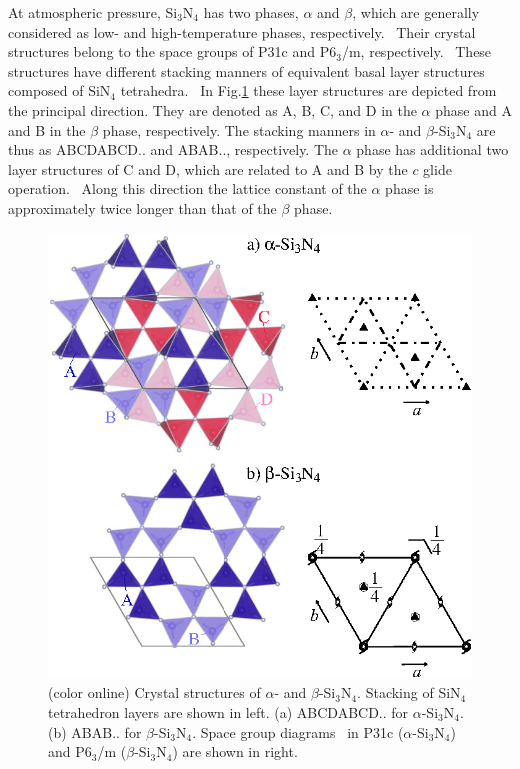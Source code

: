 \documentclass[twocolumn,amsmath,amssymb,a4paper,prb,superscriptaddress,floatfix]{revtex4-1}
\begin{document}
At atmospheric pressure, Si$_3$N$_4$ has two phases, $\alpha$ and
$\beta$, which are generally considered as low- and high-temperature phases,
respectively.~\cite{zhou,hirosaki,riley} Their crystal structures belong to the
space groups of P31c and P6$_3$/m, respectively.~\cite{yashima,boulay} These
structures have different stacking manners of equivalent basal layer structures
composed of SiN$_4$ tetrahedra.~\cite{hampshire} In Fig.\ref{fig:Fig1_cryst}
these layer structures are depicted from the principal direction. They are
denoted as A, B, C, and D in the $\alpha$ phase and A and B in the $\beta$
phase, respectively. The stacking manners in $\alpha$- and $\beta$-Si$_3$N$_4$
are thus as ABCDABCD.. and ABAB.., respectively.  The $\alpha$ phase has
additional two layer structures of C and D, which are related to A and B by
the $c$ glide operation.~\cite{hampshire} Along this direction the lattice
constant of the $\alpha$ phase is approximately twice longer than that of the
$\beta$ phase.
\begin{figure}[ht]
 \begin{center}
  \includegraphics[width=0.90\linewidth]{Fig1_crystal_str2.eps} \caption{(color
  online) Crystal structures of $\alpha$- and $\beta$-Si$_3$N$_4$. Stacking of
  SiN$_4$ tetrahedron layers are shown in left. (a) ABCDABCD.. for
  $\alpha$-Si$_3$N$_4$. (b) ABAB.. for $\beta$-Si$_3$N$_4$.  Space group
  diagrams~\cite{inttableA} in P31c ($\alpha$-Si$_3$N$_4$) and P6$_3$/m ($\beta$-Si$_3$N$_4$)
  are shown in right.}
  \label{fig:Fig1_cryst} 
 \end{center}
\end{figure}
\end{document}
